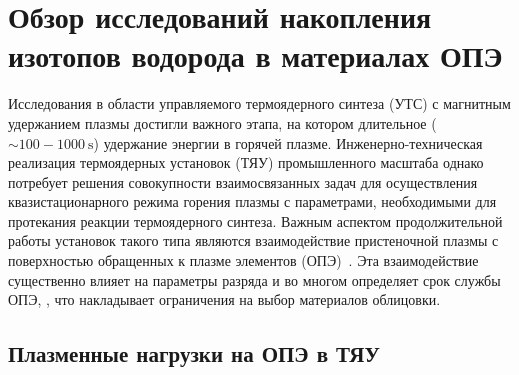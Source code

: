 \chapter{Обзор исследований накопления изотопов водорода в материалах ОПЭ}\label{ch:ch1}


Исследования в области управляемого термоядерного синтеза (УТС) с магнитным удержанием плазмы достигли важного этапа, на котором  длительное ($\sim100-\SI{1000}{\second}$) удержание энергии в горячей плазме. Инженерно-техническая реализация термоядерных установок (ТЯУ) промышленного масштаба однако потребует решения совокупности взаимосвязанных задач для осуществления квазистационарного режима горения плазмы с параметрами, необходимыми для протекания реакции термоядерного синтеза. Важным аспектом продолжительной работы установок такого типа являются взаимодействие пристеночной плазмы с поверхностью обращенных к плазме элементов (ОПЭ)~\cite{Krieger2025}. Эта взаимодействие существенно влияет на параметры разряда и во многом определяет срок службы ОПЭ, , что накладывает ограничения на выбор материалов облицовки. 

\section{Плазменные нагрузки на ОПЭ в ТЯУ}\label{sec:ch1/sec1}

